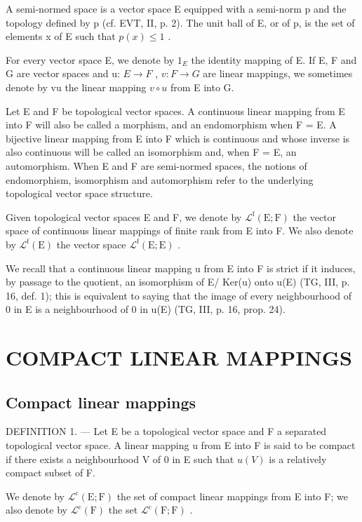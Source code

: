 A semi-normed space is a vector space E equipped with a semi-norm p and the topology defined by p (cf. EVT, II, p. 2). The unit ball of E, or of p, is the set of elements x of E such that \(p(x) \leqslant 1\) .

For every vector space E, we denote by \(1_{E}\) the identity mapping of E. If E, F and G are vector spaces and u: \(E \rightarrow F\) , \(v: F \rightarrow G\) are linear mappings, we sometimes denote by vu the linear mapping \(v \circ u\) from E into G.

Let E and F be topological vector spaces. A continuous linear mapping from E into F will also be called a morphism, and an endomorphism when F = E. A bijective linear mapping from E into F which is continuous and whose inverse is also continuous will be called an isomorphism and, when F = E, an automorphism. When E and F are semi-normed spaces, the notions of endomorphism, isomorphism and automorphism refer to the underlying topological vector space structure.

Given topological vector spaces E and F, we denote by \(\mathcal{L}^{\mathrm{f}}(\mathrm{E};\mathrm{F})\) the vector space of continuous linear mappings of finite rank from E into F. We also denote by \(\mathcal{L}^{\mathrm{f}}(\mathrm{E})\) the vector space \(\mathcal{L}^{\mathrm{f}}(\mathrm{E};\mathrm{E})\) .

We recall that a continuous linear mapping u from E into F is strict if it induces, by passage to the quotient, an isomorphism of E/ Ker(u) onto u(E) (TG, III, p. 16, def. 1); this is equivalent to saying that the image of every neighbourhood of 0 in E is a neighbourhood of 0 in u(E) (TG, III, p. 16, prop. 24).

\section{COMPACT LINEAR MAPPINGS}

\subsection{Compact linear mappings}

DEFINITION 1. --- Let E be a topological vector space and F a separated topological vector space. A linear mapping u from E into F is said to be compact if there exists a neighbourhood V of 0 in E such that \(u(V)\) is a relatively compact subset of F.

We denote by \(\mathcal{L}^{\mathrm{c}}(\mathrm{E};\mathrm{F})\) the set of compact linear mappings from E into F; we also denote by \(\mathcal{L}^{\mathrm{c}}(\mathrm{F})\) the set \(\mathcal{L}^{\mathrm{c}}(\mathrm{F};\mathrm{F})\) .

